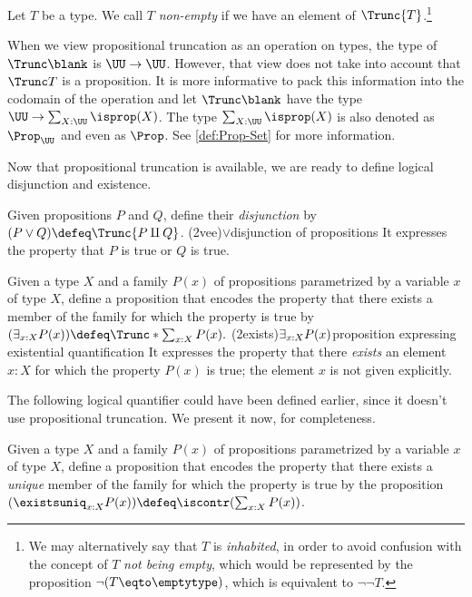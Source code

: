 \begin{definition}\label{def:non-empty}
  Let $T$ be a type.
  We call $T$ \emph{non-empty}
  if we have an element of $\Trunc{T}$.\footnote{%
    We may alternatively say that $T$ is \emph{inhabited},
    in order to avoid confusion with the
    concept of $T$ \emph{not being empty},
    which would be represented by the proposition
    $\neg(T \eqto \emptytype)$, which is equivalent to
    $\neg\neg T$.}
\end{definition}

When we view propositional truncation as an operation on types,
the type of $\Trunc \blank$ is $\UU\to\UU$. However, that view
does not take into account that $\Trunc T$ is a proposition.
It is more informative
to pack this information into the codomain of the operation
and let $\Trunc \blank$ have the type $\UU\to\sum_{X:\UU}\isprop(X)$.
The type $\sum_{X:\UU}\isprop(X)$ is also denoted as $\Prop_\UU$
and even as $\Prop$. See \cref{def:Prop-Set} for more information.

Now that propositional truncation is available,
we are ready to define logical disjunction and existence.

\begin{definition}
  Given propositions $P$ and $Q$, define their \emph{disjunction}
  by  $(P \vee Q) \defeq \Trunc{P \amalg Q}$.%
  \glossary(2vee){$\vee$}{disjunction of propositions}
  It expresses the property that $P$ is true or $Q$ is true.
\end{definition}

\begin{definition}
  Given a type $X$ and a family $P(x)$ of propositions parametrized by a variable $x$ of type $X$,
  define a proposition that encodes the property that there exists a member of the family for which
  the property is true by $(\exists_{x:X} P(x)) \defeq \Trunc*{\sum_{x:X} P(x)}.$%
  \glossary(2exists){$\protect\exists_{x:X}P(x)$}{proposition expressing
    existential quantification}
  It expresses the property that there \emph{exists} an element $x:X$ for which the property $P(x)$ is true; the element $x$ is not
  given explicitly.
\end{definition}

The following logical quantifier could have been defined earlier, since it doesn't use propositional truncation.  We present
it now, for completeness.

\begin{definition}
  Given a type $X$ and a family $P(x)$ of propositions parametrized by a variable $x$ of type $X$,
  define a proposition that encodes the property that there exists a \emph{unique} member of the family for which
  the property is true by the proposition $(\existsuniq_{x:X} P(x)) \defeq \iscontr({\sum_{x:X} P(x)})$.
\end{definition}

